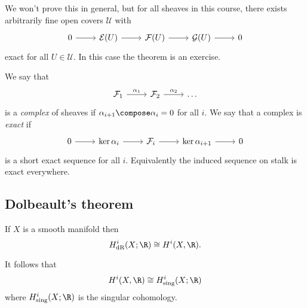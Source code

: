 \documentclass[a4paper]{article}
\begin{document}
We won't prove this in general, but for all sheaves in this course, there exists arbitrarily fine open covers \(\mathcal U\) with
\[
  \begin{tikzcd}
    0 \ar[r] & \mathcal E(U) \ar[r] & \mathcal F(U) \ar[r] & \mathcal G(U) \ar[r] & 0
  \end{tikzcd}
\]
exact for all \(U \in \mathcal U\). In this case the theorem is an exercise.

We say that
\[
  \begin{tikzcd}
    \mathcal F_1 \ar[r, "\alpha_1"] & \mathcal F_2 \ar[r, "\alpha_2"] & \dots
  \end{tikzcd}
\]
is a \emph{complex} of sheaves if \(\alpha_{i + 1} \compose \alpha_i = 0\) for all \(i\). We say that a complex is \emph{exact} if
\[
  \begin{tikzcd}
    0 \ar[r] & \ker \alpha_i \ar[r] & \mathcal F_i \ar[r] & \ker \alpha_{i + 1} \ar[r] & 0 
  \end{tikzcd}
\]
is a short exact sequence for all \(i\). Equivalently the induced sequence on stalk is exact everywhere.

\subsection{Dolbeault's theorem}

\begin{theorem}[de Rham]
  If \(X\) is a smooth manifold then
  \[
    H^i_{\text{dR}}(X; \R) \cong H^i(X, \R).
  \]
\end{theorem}

\begin{remark}
  It follows that
  \[
    H^i(X, \R) \cong H^i_{\text{sing}}(X; \R)
  \]
  where \(H^i_{\text{sing}}(X; \R)\) is the singular cohomology.
\end{remark}
\end{document}
